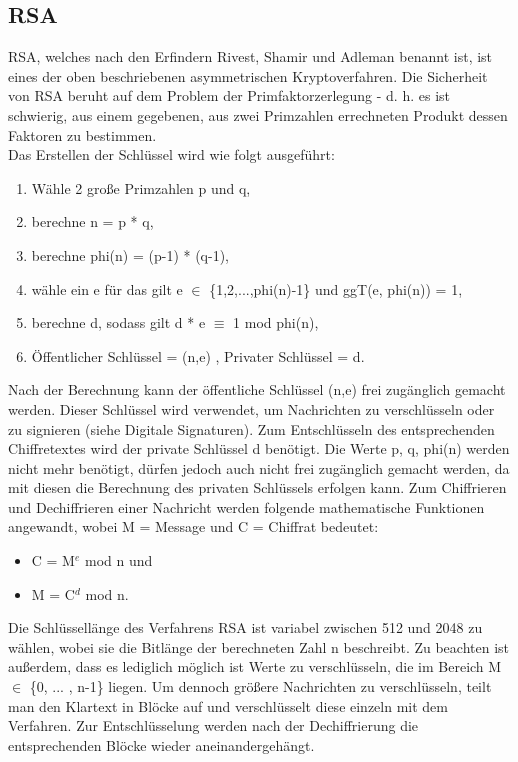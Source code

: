 \documentclass[10pt, a4paper,headsepline,pointednumbers]{scrreprt}
\begin{document}
\subsection{RSA}
RSA, welches nach den Erfindern Rivest, Shamir und Adleman benannt ist, ist eines der oben beschriebenen asymmetrischen Kryptoverfahren. Die Sicherheit von RSA beruht auf dem Problem der Primfaktorzerlegung - d. h. es ist schwierig, aus einem gegebenen, aus zwei Primzahlen errechneten Produkt dessen Faktoren zu bestimmen. \\
Das Erstellen der Schlüssel wird wie folgt ausgeführt: \\
\begin{enumerate}
\item Wähle 2 große Primzahlen p und q, 
\item berechne n = p * q, 
\item berechne phi(n) = (p-1) * (q-1), 
\item wähle ein e für das gilt e $\in$ \{1,2,...,phi(n)-1\} und ggT(e, phi(n)) = 1, 
\item berechne d, sodass gilt d * e $\equiv$ 1 mod phi(n), 
\item Öffentlicher Schlüssel = (n,e) , Privater Schlüssel = d. \\
\end{enumerate} 
Nach der Berechnung kann der öffentliche Schlüssel (n,e) frei zugänglich gemacht werden. Dieser Schlüssel wird verwendet, um Nachrichten zu verschlüsseln oder zu signieren (siehe Digitale Signaturen). Zum Entschlüsseln des entsprechenden Chiffretextes wird der private Schlüssel d benötigt. Die Werte p, q, phi(n) werden nicht mehr benötigt, dürfen jedoch auch nicht frei zugänglich gemacht werden, da mit diesen die Berechnung des privaten Schlüssels erfolgen kann. Zum Chiffrieren und Dechiffrieren einer Nachricht werden folgende mathematische Funktionen angewandt, wobei M = Message und C = Chiffrat bedeutet: \\
\begin{itemize}
\item C = M$^{e}$ mod n und
\item M = C$^{d}$ mod n. \\
\end{itemize}
Die Schlüssellänge des Verfahrens RSA ist variabel zwischen 512 und 2048 zu wählen, wobei sie die Bitlänge der berechneten Zahl n beschreibt. Zu beachten ist außerdem, dass es lediglich möglich ist Werte zu verschlüsseln, die im Bereich M $\in$ \{0, ... , n-1\} liegen. Um dennoch größere Nachrichten zu verschlüsseln, teilt man den Klartext in Blöcke auf und verschlüsselt diese einzeln mit dem Verfahren. Zur Entschlüsselung werden nach der Dechiffrierung die entsprechenden Blöcke wieder aneinandergehängt. \\
\end{document}
